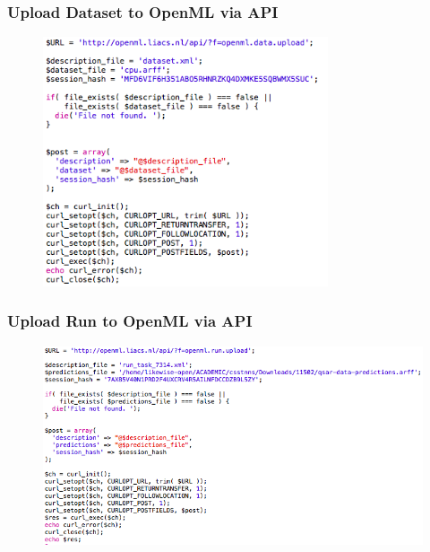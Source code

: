 \documentclass[compress]{beamer}
\begin{document}
\begin{frame}
\frametitle{Upload Dataset to OpenML via API} 

\begin{figure}[h!]
  \centering
    \includegraphics[width=0.75\textwidth]{openml-ds}
\end{figure}

\end{frame}

\begin{frame}
\frametitle{Upload Run to OpenML via API} 

\begin{figure}[h!]
  \centering
    \includegraphics[width=1.10\textwidth]{openml-run}
\end{figure}

\end{frame}
\end{document}
